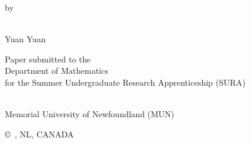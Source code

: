 \pagestyle{empty}

\begin{titlepage}
        \begin{center}
        \vspace*{1.0cm}

        \Huge
        {\bf \thesistitlecoverpage }

        \vspace*{1.0cm}

        \normalsize
        by \\

        \vspace*{1.0cm}

        \Large
        \thesisauthor \\
        Yuan Yuan \\

        \vspace*{3.0cm}

        \normalsize
        Paper submitted to the\\
        Department of Mathematics\\
        for the Summer Undergraduate Research Apprenticeship (SURA) %

        \vspace*{2.0cm}

        \academicunit\\
        Memorial University of Newfoundland (MUN)\\

        \vspace*{1.0cm}

        \copyright~\thesisauthor, NL, CANADA \graduationyear\\
        \end{center}
\end{titlepage}

\pagestyle{plain}
\setcounter{page}{2}

\cleardoublepage %

